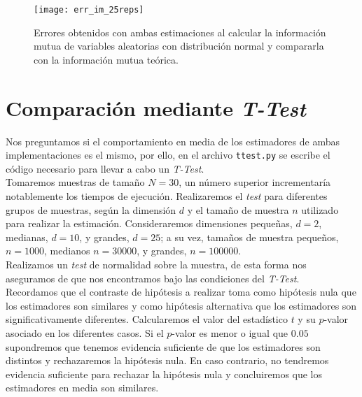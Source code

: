 \documentclass[12pt,a4paper]{report} %
\theoremstyle{definition}
\begin{document}
\begin{figure}[H]
    \centering
    \texttt{[image: err\_im\_25reps]}
    \caption{Errores obtenidos con ambas estimaciones al calcular la información mutua de variables aleatorias con distribución normal y compararla con la información mutua teórica.}
    \label{fig:err_im}
\end{figure}

\section{Comparación mediante \textit{T-Test}}

Nos preguntamos si el comportamiento en media de los estimadores de ambas implementaciones es el mismo, por ello, en el archivo \texttt{ttest.py} se escribe el código necesario para llevar a cabo un \textit{T-Test}.\\

Tomaremos muestras de tamaño $N=30$, un número superior incrementaría notablemente los tiempos de ejecución. Realizaremos el \textit{test} para diferentes grupos de muestras, según la dimensión $d$ y el tamaño de muestra $n$ utilizado para realizar la estimación. Consideraremos dimensiones pequeñas, $d=2$, medianas, $d=10$, y grandes, $d=25$; a su vez, tamaños de muestra pequeños, $n=1000$, medianos $n=30000$, y grandes, $n=100000$.\\

Realizamos un \textit{test} de normalidad sobre la muestra, de esta forma nos aseguramos de que nos encontramos bajo las condiciones del \textit{T-Test}.\\

Recordamos que el contraste de hipótesis a realizar toma como hipótesis nula que los estimadores son similares y como hipótesis alternativa que los estimadores son significativamente diferentes. Calcularemos el valor del estadístico $t$ y su $p$-valor asociado en los diferentes casos. Si el $p$-valor es menor o igual que $0.05$ supondremos que tenemos evidencia suficiente de que los estimadores son distintos y rechazaremos la hipótesis nula. En caso contrario, no tendremos evidencia suficiente para rechazar la hipótesis nula y concluiremos que los estimadores en media son similares.\\
\end{document}
